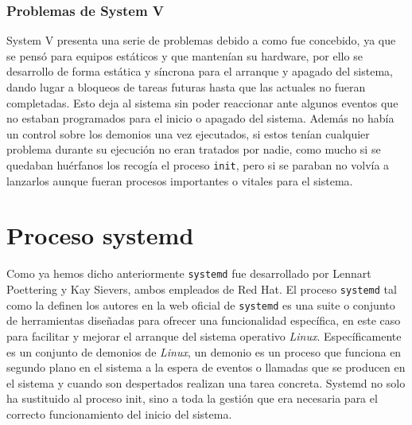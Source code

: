 \subsubsection{Problemas de System V}
System V presenta una serie de problemas debido a como fue concebido, ya que se pensó para equipos estáticos y que mantenían su hardware, por ello se desarrollo de forma estática y síncrona para el arranque y apagado del sistema, dando lugar a bloqueos de tareas futuras hasta que las actuales no fueran completadas. Esto deja al sistema sin poder reaccionar ante algunos eventos que no estaban programados para el inicio o apagado del sistema. Además no había un control sobre los demonios una vez ejecutados, si estos tenían cualquier problema durante su ejecución no eran tratados por nadie, como mucho si se quedaban huérfanos los recogía el proceso \texttt{init}, pero si se paraban no volvía a lanzarlos aunque fueran procesos importantes o vitales para el sistema.

\section{Proceso systemd} %

Como ya hemos dicho anteriormente \texttt{systemd} fue desarrollado por Lennart Poettering y Kay Sievers, ambos empleados de Red Hat.
El proceso \texttt{systemd} tal como la definen los autores en la web oficial de \texttt{systemd} \cite{systemd} es una suite o conjunto de herramientas diseñadas para ofrecer una funcionalidad específica, en este caso para facilitar y mejorar el arranque del sistema operativo \textit{Linux}. Específicamente es un conjunto de demonios de \textit{Linux}, un demonio \cite{daemons} es un proceso que funciona en segundo plano en el sistema a la espera de eventos o llamadas que se producen en el sistema y cuando son despertados realizan una tarea concreta. Systemd no solo ha sustituido al proceso init, sino a toda la gestión que era necesaria para el correcto funcionamiento del inicio del sistema.\\

